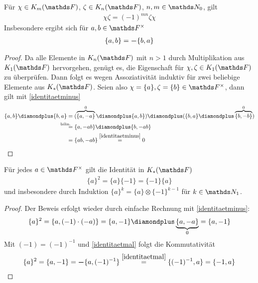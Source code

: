 \documentclass[ngerman,fontsize=11pt, paper=a4, parskip=half, titlepage=true, toc=bib]{scrartcl}
\begin{document}
\begin{Lem}\label{identitaetmal}
  Für $\chi\in\K_m(\F)$, $\zeta\in\K_n(\F)$, $n,m\in\N_0$, gilt
  \begin{gather*}
    \chi\zeta=(-1)^{mn}\zeta\chi
  \end{gather*}
  Insbesondere ergibt sich für $a,b\in \Fx$
  \begin{gather*}
    \{a,b\}= \boldsymbol -\{b,a\}
  \end{gather*}
  \begin{proof}
    Da alle Elemente in $\KnF$ mit $n>1$ durch Multiplikation aus
    $\KoF$ hervorgehen, genügt es, die Eigenschaft für
    $\chi,\zeta\in\KoF$ zu überprüfen. Dann folgt es wegen
    Assoziativität induktiv für zwei beliebige Elemente aus $\KF$.
    Seien also $\chi=\{a\},\zeta=\{b\}\in\Fx$, dann gilt mit \ref{identitaetminus}
    \begin{align*}
      \{a,b\}\p \{b,a\} 
      &= (\overbrace{\{a,-a\}}^{0} \p \{a,b\} )
        \p (\{b,a\} \p \overbrace{\{b,-b\}}^{0} ) \\
      &\overset{\mathllap{\text{bilin.}}}{=} \{ a,-ab \} \p \{b, -ab\}\\
      &= \{ ab, -ab\} \overset{\ref{identitaetminus}}{=} 0
    \end{align*}
  \end{proof}
\end{Lem}

\begin{Lem}\label{identitaetquadrat}
  Für jedes $a\in \Fx$ gilt die Identität in $\KF$
  \begin{gather*}
    \{a\}^2 = \{a\}\{-1\} = \{-1\}\{a\}
  \end{gather*}
  und insbesondere durch Induktion $\{a\}^k=\{a\}\otimes\{-1\}^{k-1}$
  für $k\in\N_1$.
  \begin{proof}
    Der Beweis erfolgt wieder durch einfache Rechnung mit
    \ref{identitaetminus}:
    \begin{gather*}
      \{a\}^2 = \{a,(-1)\cdot (-a)\} 
      = \{a,-1\}\p\underbrace{\{a,-a\}}_{0} = \{a,-1\}
    \end{gather*}
    Mit $(-1)=(-1)^{-1}$ und \ref{identitaetmal} folgt die Kommutativität
    \begin{gather*}
      \{a\}^2 = \{a,-1\}= \boldsymbol -\{a,(-1)^{-1}\} 
      \overset{\ref{identitaetmal}}{=} \{(-1)^{-1},a\} = \{-1,a\}
    \end{gather*}
  \end{proof}
\end{Lem}
\end{document}
